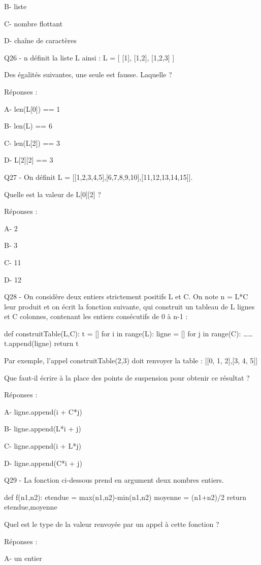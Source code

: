 \documentclass[
]{book}
\begin{document}
B- liste

C- nombre flottant

D- chaîne de caractères

Q26 - n définit la liste L ainsi : L = {[} {[}1{]}, {[}1,2{]}, {[}1,2,3{]} {]}

Des égalités suivantes, une seule est fausse. Laquelle ?

Réponses :

A- len(L{[}0{]}) == 1

B- len(L) == 6

C- len(L{[}2{]}) == 3

D- L{[}2{]}{[}2{]} == 3

Q27 - On définit L = {[}{[}1,2,3,4,5{]},{[}6,7,8,9,10{]},{[}11,12,13,14,15{]}{]}.

Quelle est la valeur de L{[}0{]}{[}2{]} ?

Réponses :

A- 2

B- 3

C- 11

D- 12

Q28 - On considère deux entiers strictement positifs L et C. On note n = L*C leur produit et on écrit la fonction suivante, qui construit un tableau de L lignes et C colonnes, contenant les entiers consécutifs de 0 à n-1 :

def construitTable(L,C):
t = {[}{]}
for i in range(L):
ligne = {[}{]}
for j in range(C):
\ldots\ldots{}
t.append(ligne)
return t

Par exemple, l'appel construitTable(2,3) doit renvoyer la table : {[}{[}0, 1, 2{]},{[}3, 4, 5{]}{]}

Que faut-il écrire à la place des points de suspension pour obtenir ce résultat ?

Réponses :

A- ligne.append(i + C*j)

B- ligne.append(L*i + j)

C- ligne.append(i + L*j)

D- ligne.append(C*i + j)

Q29 - La fonction ci-dessous prend en argument deux nombres entiers.

def f(n1,n2):
etendue = max(n1,n2)-min(n1,n2)
moyenne = (n1+n2)/2
return etendue,moyenne

Quel est le type de la valeur renvoyée par un appel à cette fonction ?

Réponses :

A- un entier
\end{document}
